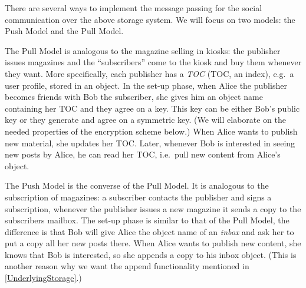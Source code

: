 
There are several ways to implement the message passing for the social 
communication over the above storage system.
We will focus on two models: the Push Model and the Pull Model.

The Pull Model is analogous to the magazine selling in kiosks:
the publisher issues magazines and the \enquote{subscribers} come to the kiosk 
and buy them whenever they want.
More specifically, each publisher has a \emph{\acl{TOC}} (\acs{TOC}, an index), 
e.g.\ a user profile, stored in an object.
In the set-up phase, when Alice the publisher becomes friends with Bob the 
subscriber, she gives him an object name containing her \ac{TOC} and they agree 
on a key.
This key can be either Bob's public key or they generate and agree on 
a symmetric key.
(We will elaborate on the needed properties of the encryption scheme below.)
When Alice wants to publish new material, she updates her \ac{TOC}.
Later, whenever Bob is interested in seeing new posts by Alice, he can read her 
\ac{TOC}, i.e.\ pull new content from Alice's object.

The Push Model is the converse of the Pull Model.
It is analogous to the subscription of magazines:
a subscriber contacts the publisher and signs a subscription, whenever the 
publisher issues a new magazine it sends a copy to the subscribers mailbox.
The set-up phase is similar to that of the Pull Model, the difference is that 
Bob will give Alice the object name of an \emph{inbox} and ask her to put 
a copy all her new posts there.
When Alice wants to publish new content, she knows that Bob is interested, so 
she appends a copy to his inbox object.
(This is another reason why we want the append functionality mentioned in 
\cref{UnderlyingStorage}.)


